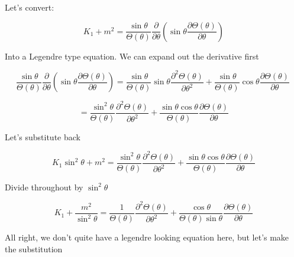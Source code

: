 \documentclass[12pt]{article}
\renewcommand{\_}{\kern-1.5pt\textunderscore\kern-1.5pt}
\begin{document}
Let’s convert:\par

 \[ K_{1}+m^{2}=\frac{\sin  \theta }{ \Theta  \left(  \theta  \right) }\frac{ \partial }{ \partial  \theta } \left( \sin  \theta \frac{ \partial  \Theta  \left(  \theta  \right) }{ \partial  \theta } \right)  \] \par

Into a Legendre type equation. We can expand out the derivative first\par

 \[ \frac{\sin  \theta }{ \Theta  \left(  \theta  \right) }\frac{ \partial }{ \partial  \theta } \left( \sin  \theta \frac{ \partial  \Theta  \left(  \theta  \right) }{ \partial  \theta } \right) =\frac{\sin  \theta }{ \Theta  \left(  \theta  \right) }\sin  \theta \frac{ \partial ^{2} \Theta  \left(  \theta  \right) }{ \partial  \theta ^{2}}+\frac{\sin  \theta }{ \Theta  \left(  \theta  \right) }\cos  \theta \frac{ \partial  \Theta  \left(  \theta  \right) }{ \partial  \theta }~ \] \par

 \[ =\frac{\sin ^{2} \theta }{ \Theta  \left(  \theta  \right) }\frac{ \partial ^{2} \Theta  \left(  \theta  \right) }{ \partial  \theta ^{2}}+\frac{\sin  \theta \cos  \theta }{ \Theta  \left(  \theta  \right) }\frac{ \partial  \Theta  \left(  \theta  \right) }{ \partial  \theta } \] \par

Let’s substitute back\par

 \[ K_{1}\sin ^{2} \theta +m^{2}=\frac{\sin ^{2} \theta }{ \Theta  \left(  \theta  \right) }\frac{ \partial ^{2} \Theta  \left(  \theta  \right) }{ \partial  \theta ^{2}}+\frac{\sin  \theta \cos  \theta }{ \Theta  \left(  \theta  \right) }\frac{ \partial  \Theta  \left(  \theta  \right) }{ \partial  \theta } \] \par

Divide throughout by  \( \sin ^{2} \theta  \) \par

 \[ K_{1}+\frac{m^{2}}{\sin ^{2} \theta }=\frac{1}{ \Theta  \left(  \theta  \right) }\frac{ \partial ^{2} \Theta  \left(  \theta  \right) }{ \partial  \theta ^{2}}+\frac{\cos  \theta }{ \Theta  \left(  \theta  \right) \sin  \theta }\frac{ \partial  \Theta  \left(  \theta  \right) }{ \partial  \theta } \] \par

All right, we don’t quite have a legendre looking equation here, but let’s make the substitution \par
\end{document}
